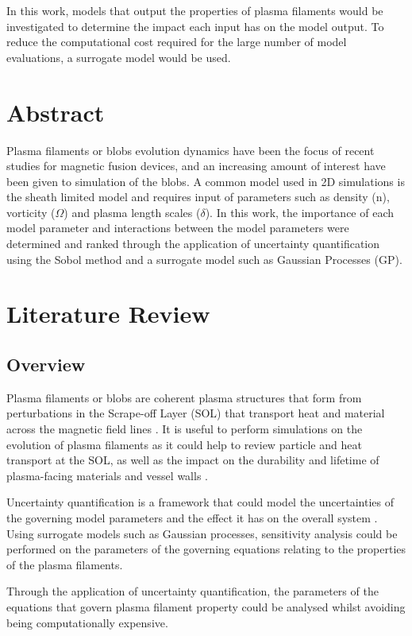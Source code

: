 \documentclass{article}
\begin{document}
In this work, models that output the properties of plasma filaments would be investigated to determine the impact each input has on the model output. To reduce the computational cost required for the large number of model evaluations, a surrogate model would be used.    

\section*{Abstract}
Plasma filaments or blobs evolution dynamics have been the focus of recent studies for magnetic fusion devices, and an increasing amount of interest have been given to simulation of the blobs. A common model used in 2D simulations is the sheath limited model and requires input of parameters such as density (n), vorticity ($\Omega$) and plasma length scales ($\delta$). In this work, the importance of each model parameter and interactions between the model parameters were determined and ranked through the application of uncertainty quantification using the Sobol method and a surrogate model such as Gaussian Processes (GP).

\section*{Literature Review}
\subsection*{Overview}
Plasma filaments or blobs are coherent plasma structures that form from perturbations in the Scrape-off Layer (SOL) that transport heat and material across the magnetic field lines \cite{dippolito_convective_2011, hoare_dynamics_2019}. It is useful to perform simulations on the evolution of plasma filaments as it could help to review particle and heat transport at the SOL, as well as the impact on the durability and lifetime of plasma-facing materials and vessel walls \cite{carralero_experimental_2015, krasheninnikov_recent_2008}. 

Uncertainty quantification is a framework that could model the uncertainties of the governing model parameters and the effect it has on the overall system \cite{sudret_surrogate_2017}. Using surrogate models such as Gaussian processes, sensitivity analysis could be performed on the parameters of the governing equations relating to the properties of the plasma filaments.

Through the application of uncertainty quantification, the parameters of the equations that govern plasma filament property could be analysed whilst avoiding being computationally expensive. 
\end{document}
